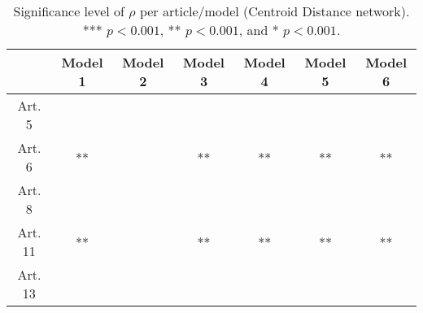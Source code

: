 \begin{table}[ht]
\centering
\begin{tabular}{ccccccc}
  \toprule
 & Model 1 & Model 2 & Model 3 & Model 4 & Model 5 & Model 6 \\ 
  \midrule
Art. 5 &   &   &   &   &   &   \\ 
   \midrule
Art. 6 & ** &   & ** & ** & ** & ** \\ 
   \midrule
Art. 8 &   &   &   &   &   &   \\ 
   \midrule
Art. 11 & ** &   & ** & ** & ** & ** \\ 
   \midrule
Art. 13 &   &   &   &   &   &   \\ 
   \bottomrule
\end{tabular}
\caption{Significance level of $\rho$ per article/model (Centroid Distance network). *** $p < 0.001$, ** $p < 0.001$, and * $p < 0.001$.} 
\end{table}
